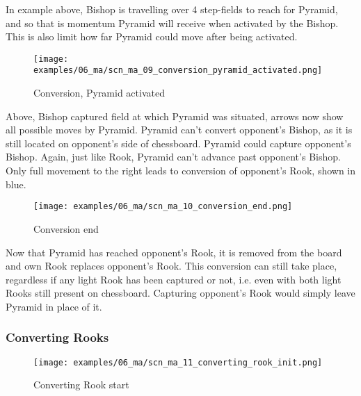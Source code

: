 In example above, Bishop is travelling over 4 step-fields to reach for Pyramid,
and so that is momentum Pyramid will receive when activated by the Bishop.
This is also limit how far Pyramid could move after being activated.

\clearpage %

\noindent
\begin{figure}[!h]
\texttt{[image: examples/06\_ma/scn\_ma\_09\_conversion\_pyramid\_activated.png]}
\caption{Conversion, Pyramid activated}
\label{fig:scn_ma_09_conversion_pyramid_activated}
\end{figure}

Above, Bishop captured field at which Pyramid was situated, arrows now show all
possible moves by Pyramid. Pyramid can't convert opponent's Bishop, as it is still
located on opponent's side of chessboard. Pyramid could capture opponent's Bishop.
Again, just like Rook, Pyramid can't advance past opponent's Bishop. Only full
movement to the right leads to conversion of opponent's Rook, shown in blue.

\clearpage %

\noindent
\begin{figure}[!h]
\texttt{[image: examples/06\_ma/scn\_ma\_10\_conversion\_end.png]}
\caption{Conversion end}
\label{fig:scn_ma_10_conversion_end}
\end{figure}

Now that Pyramid has reached opponent's Rook, it is removed from the board and
own Rook replaces opponent's Rook. This conversion can still take place, regardless
if any light Rook has been captured or not, i.e. even with both light Rooks still
present on chessboard. Capturing opponent's Rook would simply leave Pyramid in
place of it.

\clearpage %

\subsubsection*{Converting Rooks}
\label{sec:Mayan Ascendancy/Pyramid/Conversion/Converting Rooks}

\vspace*{-1.1\baselineskip}
\noindent
\begin{figure}[!h]
\texttt{[image: examples/06\_ma/scn\_ma\_11\_converting\_rook\_init.png]}
\caption{Converting Rook start}
\label{fig:scn_ma_11_converting_rook_init}
\end{figure}

